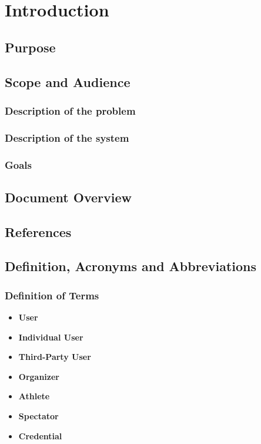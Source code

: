 \documentclass[a4paper]{article}
\begin{document}

\tableofcontents
\newpage
\listoffigures
\newpage
\listoftables
\newpage
\section{Introduction}

    \subsection{Purpose}
    
    \subsection{Scope and Audience}
        \subsubsection{Description of the problem}
        
        \subsubsection{Description of the system}
        
        \subsubsection{Goals}
    
    \subsection{Document Overview}
    
    \subsection{References}
        \printbibliography
    
    \subsection{Definition, Acronyms and  Abbreviations}
            
            \subsubsection{Definition of Terms}
                \begin{itemize}
                    \item \textbf{User}
                    \item \textbf{Individual User}
                    \item \textbf{Third-Party User}
                    \item \textbf{Organizer}
                    \item \textbf{Athlete}
                    \item \textbf{Spectator}
                    \item \textbf{Credential}
                \end{itemize}
\end{document}

